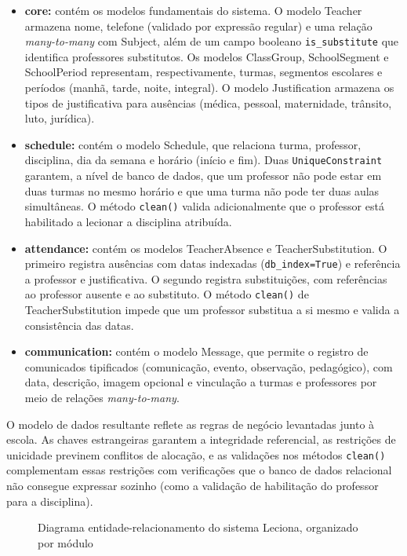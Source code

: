 \begin{itemize}
    \item \textbf{core:} contém os modelos fundamentais do sistema. O modelo Teacher armazena nome, telefone (validado por expressão regular) e uma relação \textit{many-to-many} com Subject, além de um campo booleano \texttt{is\_substitute} que identifica professores substitutos. Os modelos ClassGroup, SchoolSegment e SchoolPeriod representam, respectivamente, turmas, segmentos escolares e períodos (manhã, tarde, noite, integral). O modelo Justification armazena os tipos de justificativa para ausências (médica, pessoal, maternidade, trânsito, luto, jurídica).
    \item \textbf{schedule:} contém o modelo Schedule, que relaciona turma, professor, disciplina, dia da semana e horário (início e fim). Duas \texttt{UniqueConstraint} garantem, a nível de banco de dados, que um professor não pode estar em duas turmas no mesmo horário e que uma turma não pode ter duas aulas simultâneas. O método \texttt{clean()} valida adicionalmente que o professor está habilitado a lecionar a disciplina atribuída.
    \item \textbf{attendance:} contém os modelos TeacherAbsence e TeacherSubstitution. O primeiro registra ausências com datas indexadas (\texttt{db\_index=True}) e referência a professor e justificativa. O segundo registra substituições, com referências ao professor ausente e ao substituto. O método \texttt{clean()} de TeacherSubstitution impede que um professor substitua a si mesmo e valida a consistência das datas.
    \item \textbf{communication:} contém o modelo Message, que permite o registro de comunicados tipificados (comunicação, evento, observação, pedagógico), com data, descrição, imagem opcional e vinculação a turmas e professores por meio de relações \textit{many-to-many}.
\end{itemize}

O modelo de dados resultante reflete as regras de negócio levantadas junto à escola. As chaves estrangeiras garantem a integridade referencial, as restrições de unicidade previnem conflitos de alocação, e as validações nos métodos \texttt{clean()} complementam essas restrições com verificações que o banco de dados relacional não consegue expressar sozinho (como a validação de habilitação do professor para a disciplina).

\begin{figure}[H]
\centering
\resizebox{\textwidth}{!}{}
\caption{Diagrama entidade-relacionamento do sistema Leciona, organizado por módulo}
\label{fig:diagrama-er}
\end{figure}

